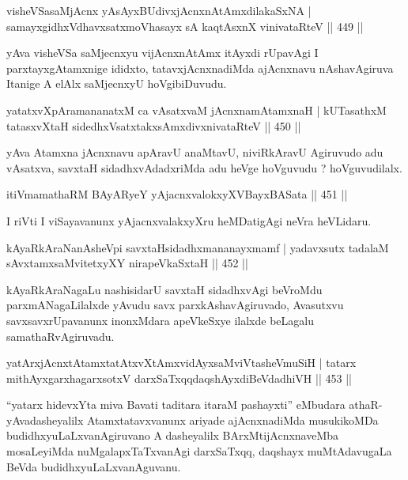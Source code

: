 \begin{shl}
visheVSasaMjAcnx yA\s sAyxBUdivxjAcnxnAtAmxdilakaSxNA |
samayxgidhxVdhavxsatxmoVhasayx sA kaqtAsxnX vinivataRteV \hfill  || 449 ||
\end{shl}

\begin{artha}
yAva visheVSa saMjecnxyu vijAcnxnAtAmx itAyxdi rUpavAgi I parxtayxgAtamxnige ididxto, tatavxjAcnxnadiMda ajAcnxnavu nAshavAgiruva Itanige A elAlx saMjecnxyU hoVgibiDuvudu.
\end{artha}

\begin{shl}
yatatxvXpAramananatxM ca vAsatxvaM jAcnxnamAtamxnaH |
kUTasathxM tatasxvXtaH sidedhxVsatxtakxsAmxdivxnivataRteV \hfill  || 450 ||
\end{shl}

\begin{artha}
yAva Atamxna jAcnxnavu apAravU anaMtavU, niviRkAravU Agiruvudo adu vAsatxva, savxtaH sidadhxvAdadxriMda adu heVge hoVguvudu ? hoVguvudilalx.
\end{artha}

\begin{shl}
itiVmamathaRM BAyARyeY yAjacnxvalokxyXV\s BayxBASata \hfill  || 451 ||
\end{shl}

\begin{artha}
I riVti I viSayavanunx yAjacnxvalakxyXru heMDatigAgi neVra heVLidaru.
\end{artha}

\begin{shl}
kAyaRkAraNanAsheV\s pi savxtaHsidadhxmananayxmamf |
yadavxsutx tadalaM sAvxtamxsaMvitetxyXY nirapeVkaSxtaH \hfill  || 452 ||
\end{shl}

\begin{artha}
kAyaRkAraNagaLu nashisidarU savxtaH sidadhxvAgi beVroMdu parxmANagaLilalxde yAvudu savx parxkAshavAgiruvado, Avasutxvu savxsavxrUpavanunx inonxMdara apeVkeSxye ilalxde beLagalu samathaRvAgiruvadu.
\end{artha}

\begin{shl}
yatArxjAcnxtAtamxtatAtxvXtAmx\s vidAyxsaMviVtasheVmuSiH |
tatarx mithAyxgarxhagarxsotxV darxSaTxqqdaqshAyxdiBeVdadhiVH \hfill  || 453 ||
\end{shl}

\begin{artha}
``yatarx hidevxYta miva Bavati taditara itaraM pashayxti'' eMbudara   athaR- yAva\-dasheyalilx Atamxtatavxvanunx ariyade ajAcnxnadiMda   musukikoMDa budidhxyuLaLxvanAgi\-ruvano A dasheyalilx   BArxMtijAcnxnaveMba mosaLeyiMda nuMgalapxTaTxvanAgi darxSaTxqq,   daqshayx muMtAdavugaLa BeVda budidhxyuLaLxvanAguvanu.
\end{artha}

